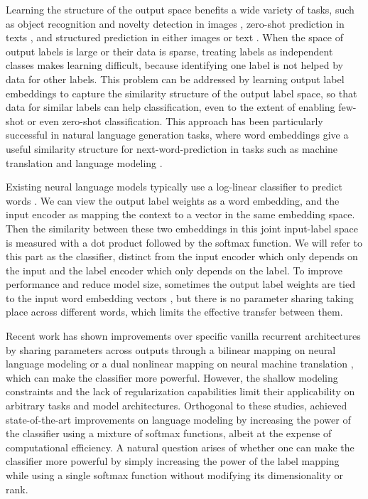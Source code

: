 \documentclass{article}
\begin{document}
 
Learning the structure of the output space benefits a wide variety of tasks, such as object recognition and novelty detection in images \cite{Weston2011,Socher13,frome13,ZhangGS16,Chen_2018_CVPR}, zero-shot prediction in texts \cite{dauphin14,yazhen15,nam16,rios-kavuluru-2018-shot}, and structured prediction in either images or text \cite{NIPS2014_5323,dyer2015,Belanger2016,NIPS2018_7869}.  When the space of output labels is large or their data is sparse, treating labels as independent classes makes learning difficult, because identifying one label is not helped by data for other labels.  This problem can be addressed by learning output label embeddings to capture the similarity structure of the output label space, so that data for similar labels can help classification, even to the extent of enabling few-shot or even zero-shot classification. This approach has been particularly successful in natural language generation tasks, where word embeddings give a useful similarity structure for next-word-prediction in tasks such as machine translation \citep{NIPS2017_7181} and language modeling \citep{merity2017regularizing}.

Existing neural language models typically use a log-linear classifier to predict words \cite{NIPS2017_7181,chen2018}. We can view the output label weights as a word embedding, and the input encoder as mapping the context to a vector in the same embedding space.  Then the similarity between these two embeddings in this joint input-label space is measured with a dot product followed by the softmax function. We will refer to this part as the classifier, distinct from the input encoder which only depends on the input and the label encoder which only depends on the label. To improve performance and reduce model size, sometimes the output label weights are tied to the input word embedding vectors  \cite{inan2016tying,press17}, but there is no parameter sharing taking place across different words, which limits the effective transfer between them.
 
Recent work has shown improvements over specific vanilla recurrent architectures by sharing parameters across outputs through a bilinear mapping on neural language modeling \cite{gulordava18} or a dual nonlinear mapping on neural machine translation \cite{pappas18}, which can make the classifier more powerful. However, the shallow modeling constraints and the lack of regularization capabilities limit their applicability on arbitrary tasks and model architectures. Orthogonal to these studies, \citet{mos2018} achieved state-of-the-art improvements on language modeling by increasing the power of the classifier using a mixture of softmax functions, albeit at the expense of computational efficiency. A natural question arises of whether one can make the classifier more powerful by simply increasing the power of the label mapping while using a single softmax function without modifying its dimensionality or rank. 
\end{document}
